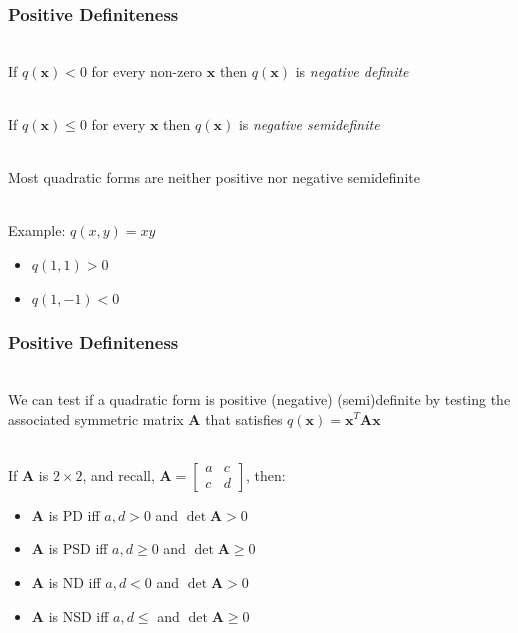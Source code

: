 \documentclass{beamer}
\numberwithin{equation}{section}
\begin{document}
\begin{frame}
\frametitle{Positive Definiteness}

\ \\If  $q(\mathbf{x})<0$ for every non-zero $\mathbf{x}$ then $q(\mathbf{x})$ is \textit{negative definite} \pause

\ \\If  $q(\mathbf{x})\leq 0$ for every $\mathbf{x}$ then $q(\mathbf{x})$ is \textit{negative semidefinite} \pause

\ \\Most  quadratic forms are neither positive nor negative semidefinite \pause

\ \\Example: $q(x, y)=xy$
\begin{itemize}
\item $q(1, 1)>0$
\item $q(1, -1)<0$
\end{itemize}

\end{frame}



\begin{frame}
\frametitle{Positive Definiteness}

\ \\We can test if a quadratic form is positive (negative) (semi)definite by testing the associated symmetric matrix $\mathbf{A}$ that satisfies $q(\mathbf{x})=\mathbf{x}^T\mathbf{A}\mathbf{x}$ \pause

\ \\If $\mathbf{A}$ is $2\times 2$, and recall, $\mathbf{A}=\begin{bmatrix}a& c\\c& d\end{bmatrix}$, then: \pause

\begin{itemize}
\item $\mathbf{A}$ is PD iff $a, d>0$ and $\det \mathbf{A}>0$ \pause
\item $\mathbf{A}$ is PSD iff  $a, d\geq0$ and $\det \mathbf{A}\geq 0$ \pause
\item $\mathbf{A}$ is ND iff $a, d<0$ and $\det \mathbf{A}>0$ \pause
\item $\mathbf{A}$ is NSD iff  $a, d\leq $ and $\det \mathbf{A}\geq 0$
\end{itemize}

\end{frame}
\end{document}
